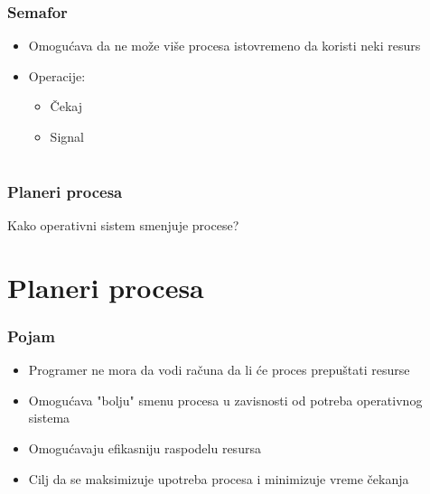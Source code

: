 \documentclass{beamer}
\begin{document}
\begin{frame}
    \frametitle{Semafor}
    \begin{itemize}
        \item Omogućava da ne može više procesa istovremeno da koristi neki resurs \newline
        \item Operacije: \begin{itemize}
            \item Čekaj
            \item Signal
        \end{itemize}
    \end{itemize}
\end{frame}

\section*{}
\subsection*{}
\begin{frame}
    \frametitle{Planeri procesa}
    \begin{center}
        \large{Kako operativni sistem smenjuje procese?}
    \end{center}
\end{frame}

\section*{Planeri procesa}
\begin{frame}
    \frametitle{Pojam}
    \begin{itemize}
        \item Programer ne mora da vodi računa da li će proces prepuštati resurse \newline
        \item Omogućava "bolju" smenu procesa u zavisnosti od potreba operativnog sistema \newline
        \item Omogućavaju efikasniju raspodelu resursa \newline
        \item Cilj da se maksimizuje upotreba procesa i minimizuje vreme čekanja
    \end{itemize}
\end{frame}
\end{document}
